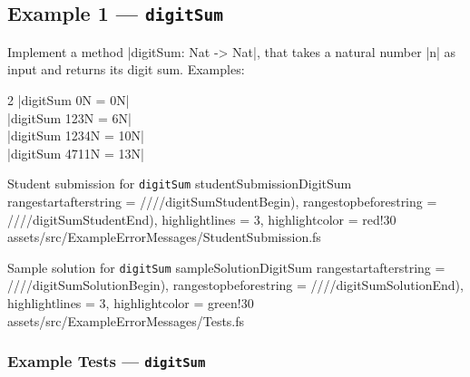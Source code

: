 \subsection{Example 1 --- \texttt{digitSum}} %


Implement a method \fsharp|digitSum: Nat -> Nat|,
that takes a natural number \fsharp|n| as input and returns its digit sum. Examples:
\begin{center}\begin{multicols}{2}
	\fsharp|digitSum 0N = 0N|\\
	\fsharp|digitSum 123N = 6N|\\
	\fsharp|digitSum 1234N = 10N|\\
	\fsharp|digitSum 4711N = 13N|
\end{multicols}\end{center}




\fsharpinput%
{Student submission for \texttt{digitSum}}%
{studentSubmissionDigitSum}%
{
	rangestartafterstring = ////digitSumStudentBegin),
	rangestopbeforestring = ////digitSumStudentEnd),
	highlightlines = {3},
	highlightcolor = red!30
}%
{assets/src/ExampleErrorMessages/StudentSubmission.fs}




\fsharpinput%
{Sample solution for \texttt{digitSum}}%
{sampleSolutionDigitSum}%
{
	rangestartafterstring = ////digitSumSolutionBegin),
	rangestopbeforestring = ////digitSumSolutionEnd),
	highlightlines = {3},
	highlightcolor = green!30
}%
{assets/src/ExampleErrorMessages/Tests.fs}


\newpage %
\subsubsection{Example Tests --- \texttt{digitSum}} %


